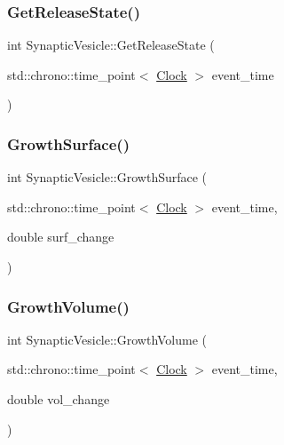 \mbox{\label{classSynapticVesicle_a6cc0018a0fd02cf99f1ba0ad31f495bc}} 
\subsubsection{\texorpdfstring{Get\+Release\+State()}{GetReleaseState()}}
{\footnotesize\ttfamily int Synaptic\+Vesicle\+::\+Get\+Release\+State (\begin{DoxyParamCaption}\item[{std\+::chrono\+::time\+\_\+point$<$ \mbox{\hyperlink{universe_8h_a0ef8d951d1ca5ab3cfaf7ab4c7a6fd80}{Clock}} $>$}]{event\+\_\+time }\end{DoxyParamCaption})\hspace{0.3cm}{\ttfamily [inline]}}

\mbox{\label{classSynapticVesicle_a045f27b28b8b11edc884568b390c22fe}} 
\subsubsection{\texorpdfstring{Growth\+Surface()}{GrowthSurface()}}
{\footnotesize\ttfamily int Synaptic\+Vesicle\+::\+Growth\+Surface (\begin{DoxyParamCaption}\item[{std\+::chrono\+::time\+\_\+point$<$ \mbox{\hyperlink{universe_8h_a0ef8d951d1ca5ab3cfaf7ab4c7a6fd80}{Clock}} $>$}]{event\+\_\+time,  }\item[{double}]{surf\+\_\+change }\end{DoxyParamCaption})}

\mbox{\label{classSynapticVesicle_a0d4a4a03405593b3abc0e734c1758830}} 
\subsubsection{\texorpdfstring{Growth\+Volume()}{GrowthVolume()}}
{\footnotesize\ttfamily int Synaptic\+Vesicle\+::\+Growth\+Volume (\begin{DoxyParamCaption}\item[{std\+::chrono\+::time\+\_\+point$<$ \mbox{\hyperlink{universe_8h_a0ef8d951d1ca5ab3cfaf7ab4c7a6fd80}{Clock}} $>$}]{event\+\_\+time,  }\item[{double}]{vol\+\_\+change }\end{DoxyParamCaption})}

